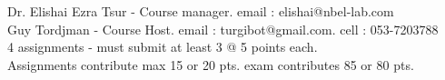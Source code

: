 \documentclass[preview]{standalone}
\begin{document}
Dr. Elishai Ezra Tsur - Course manager.     email : elishai@nbel-lab.com\\Guy Tordjman - Course Host.     email : turgibot@gmail.com.     cell : 053-7203788\\4 assignments - must submit at least 3 @ 5 points each.\\Assignments contribute max 15 or 20 pts. exam contributes 85 or 80 pts.\\
\end{document}
